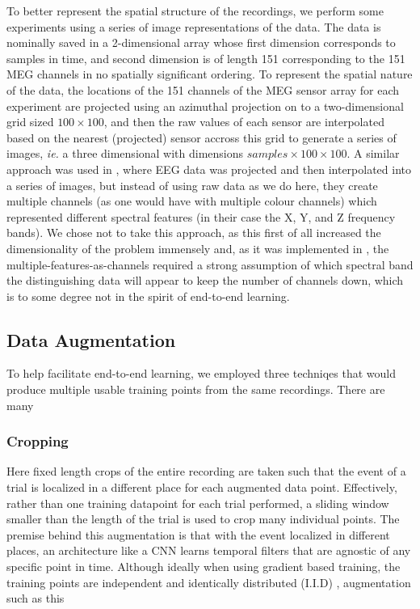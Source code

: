 \documentclass[utf8]{frontiersSCNS} %
\begin{document}
To better represent the spatial structure of the recordings, we perform some experiments using a series of image representations of the data. The data is nominally saved in a 2-dimensional array whose first dimension corresponds to samples in time, and second dimension is of length 151 corresponding to the 151 MEG channels in no spatially significant ordering. To represent the spatial nature of the data, the locations of the 151 channels of the MEG sensor array for each experiment are projected using an azimuthal projection on to a two-dimensional grid sized $100 \times 100$, and then the raw values of each sensor are  interpolated based on the nearest (projected) sensor accross this grid to generate a series of images, \emph{ie.} a three dimensional with dimensions $samples \times  100 \times 100$. A similar approach was used in \cite{}, where EEG data was projected and then interpolated into a series of images, but instead of using raw data as we do here, they create multiple channels (as one would have with multiple colour channels) which represented different spectral features (in their case the X, Y, and Z frequency bands). We chose not to take this approach, as this first of all increased the dimensionality of the problem immensely and, as it was implemented in \cite{}, the multiple-features-as-channels required a strong assumption of which spectral band the distinguishing data will appear to keep the number of channels down, which is to some degree not in the spirit of end-to-end learning.

\subsection{Data Augmentation}

To help facilitate end-to-end learning, we employed three techniqes that would produce multiple usable training points from the same recordings. There are many 

\subsubsection{Cropping}

Here fixed length crops of the entire recording are taken such that the event of a trial is localized in a different place for each augmented data point. Effectively, rather than one training datapoint for each trial performed, a sliding window smaller than the length of the trial is used to crop many individual points. The premise behind this augmentation is that with the event localized in different places, an architecture like a CNN learns temporal filters that are agnostic of any specific point in time. Although ideally when using gradient based training, the training points are independent and identically distributed (I.I.D) \cite{}, augmentation such as this 
\end{document}
